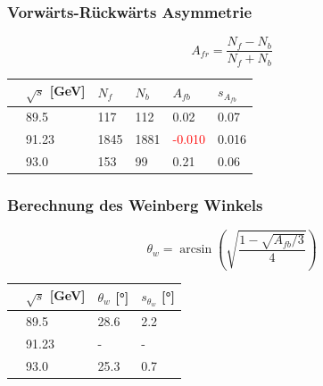 \begin{frame}
	\frametitle{Vorwärts-Rückwärts Asymmetrie}
	\begin{equation*}
		A_{fr}=\frac{N_f-N_b}{N_f+N_b}
	\end{equation*}
	\begin{table}[h]\centering
		\begin{tabular}{@{}llllll@{}}
			\toprule
			&$\sqrt{s}$ [GeV]&$N_f$&$N_b$&$A_{fb}$&$s_{A_{fb}}$\\
			\midrule
			&89.5&117&112&0.02&0.07\\
			&91.23&1845&1881&\textcolor{red}{-0.010}&0.016\\
			&93.0&153&99&0.21&0.06\\
			\bottomrule
		\end{tabular}
	\end{table}
\end{frame}
\begin{frame}
	\frametitle{Berechnung des Weinberg Winkels}
	\begin{equation*}
		\theta_w=\arcsin(\sqrt{\frac{1-\sqrt{A_{fb}/3}}{4}})
	\end{equation*}
	\begin{table}[h]\centering
		\begin{tabular}{@{}llll@{}}
			\toprule
			&$\sqrt{s}$ [GeV]&$\theta_w$ 	[°]&$s_{\theta_w}$ [°]\\
			\midrule
			&89.5&28.6&2.2\\
			&91.23&-&-\\
			&93.0&25.3&0.7\\
			\bottomrule
		\end{tabular}
	\end{table}
\end{frame}





